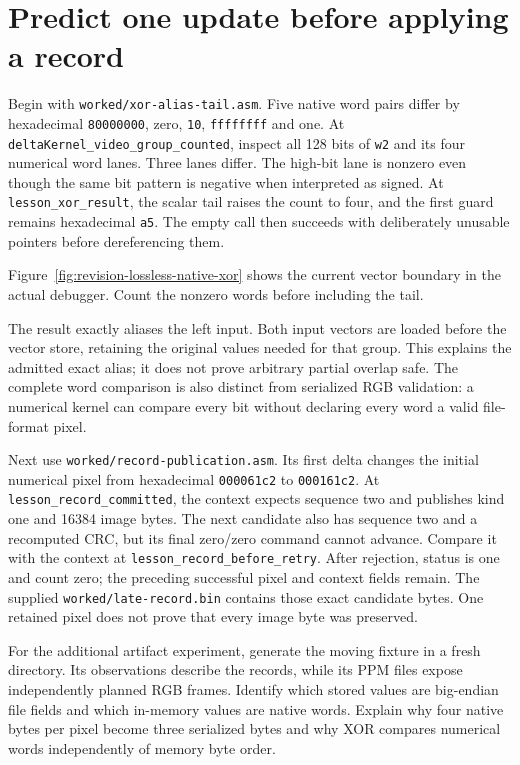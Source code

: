 \section{Predict one update before applying a record}

Begin with \texttt{worked/xor-alias-tail.asm}. Five native word pairs differ
by hexadecimal \texttt{80000000}, zero, \texttt{10}, \texttt{ffffffff} and
one. At \texttt{deltaKernel\_video\_group\_counted}, inspect all 128 bits of
\texttt{w2} and its four numerical word lanes. Three lanes differ. The high-bit
lane is nonzero even though the same bit pattern is negative when interpreted
as signed. At \texttt{lesson\_xor\_result}, the scalar tail raises the count to
four, and the first guard remains hexadecimal \texttt{a5}. The empty call then
succeeds with deliberately unusable pointers before dereferencing them.

Figure~\ref{fig:revision-lossless-native-xor} shows the current vector boundary
in the actual debugger. Count the nonzero words before including the tail.



The result exactly aliases the left input. Both input vectors are loaded before
the vector store, retaining the original values needed for that group. This
explains the admitted exact alias; it does not prove arbitrary partial overlap
safe. The complete word comparison is also distinct from serialized RGB
validation: a numerical kernel can compare every bit without declaring every
word a valid file-format pixel.

Next use \texttt{worked/record-publication.asm}. Its first delta changes the
initial numerical pixel from hexadecimal \texttt{000061c2} to
\texttt{000161c2}. At \texttt{lesson\_record\_committed}, the context expects
sequence two and publishes kind one and 16384 image bytes. The next candidate
also has sequence two and a recomputed CRC, but its final zero/zero command
cannot advance. Compare it with the context at
\texttt{lesson\_record\_before\_retry}. After rejection, status is one and
count zero; the preceding successful pixel and context fields remain. The
supplied \texttt{worked/late-record.bin} contains those exact candidate bytes.
One retained pixel does not prove that every image byte was preserved.

For the additional artifact experiment, generate the moving fixture in a fresh
directory. Its observations describe the
records, while its PPM files expose independently planned RGB frames. Identify
which stored values are big-endian file fields and which in-memory values are
native words. Explain why four native bytes per pixel become three serialized
bytes and why XOR compares numerical words independently of memory byte order.

